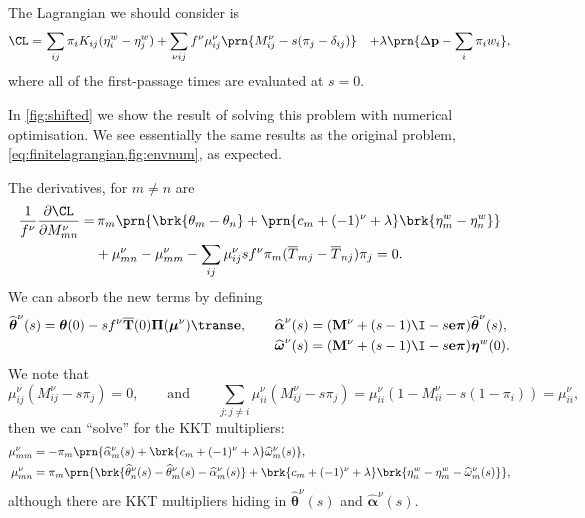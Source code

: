 \documentclass[12pt]{article}
\newcommand{\onev}{\mathbf{e}}
\newcommand{\prm}{p}
\newcommand{\pr}{\mathbf{\prm}}
\newcommand{\eqm}{\pi}
\newcommand{\eq}{\boldsymbol{\eqm}}
\newcommand{\Eqm}{\Pi}
\newcommand{\Eq}{\boldsymbol{\Eqm}}
\newcommand{\fptm}{T}
\newcommand{\fpt}{\mathbf{\fptm}}
\newcommand{\fptbm}{\overline{\fptm}}
\newcommand{\fptb}{\overline{\fpt}}
\newcommand{\etwm}{\eta^w}
\newcommand{\etw}{\boldsymbol{\eta}^w}
\newcommand{\thbm}{\theta}
\newcommand{\thb}{\boldsymbol{\thbm}}
\newcommand{\ombm}{\omega}
\newcommand{\omb}{\boldsymbol{\ombm}}
\newcommand{\albm}{\alpha}
\newcommand{\alb}{\boldsymbol{\albm}}
\newcommand{\wm}{w}
\newcommand{\MMdm}{M}
\newcommand{\MMd}{\mathbf{\MMdm}}
\newcommand{\encm}{K}
\renewcommand{\pdiff}[2]{\frac{\partial #1}{\partial #2}}
\newcommand{\shift}[1]{\widehat{#1}}
\begin{document}
The Lagrangian we should consider is
%
\begin{equation}\label{eq:lshiftlagrangian}
\begin{aligned}
  \CL =&\, \sum_{ij} \eqm_i \encm_{ij} (\etwm_i - \etwm_j)
        +\sum_{\nu i j}  f^\nu \mu^\nu_{ij}\prn{\MMdm^\nu_{ij} -  s (\eqm_j - \delta_{ij}) }
        &+ \lambda \prn{ \Delta\pr - \sum_i \eqm_i \wm_i },
\end{aligned}
\end{equation}
%
where all of the first-passage times are evaluated at \(s = 0\).

In \cref{fig:shifted} we show the result of solving this problem with numerical optimisation.
We see essentially the same results as the original problem, \cref{eq:finitelagrangian,fig:envnum}, as expected.

The derivatives, for $m \neq n$ are
%
\begin{equation}\label{eq:lshiftderivs}
\begin{aligned}
  \frac{1}{f^\nu} \pdiff{\CL}{\MMdm^\nu_{mn}} = & \,
    \eqm_m \prn{ \brk{\thbm_m - \thbm_n}
     + \prn{{c}_m + (-1)^\nu + \lambda} \brk{\etwm_m - \etwm_n} } \\
     &+ \mu^\nu_{mn} -  \mu^\nu_{mm}
     - \sum_{ij} \mu^\nu_{ij} s f^\nu \eqm_m (\fptbm_{mj} - \fptbm_{nj}) \eqm_j
    = 0.
\end{aligned}
\end{equation}
%
We can absorb the new terms by defining
%
\begin{equation*}
\begin{aligned}
  \shift{\thb}^\nu(s) = \thb(0) - s f^\nu \fptb(0) \Eq (\boldsymbol{\mu}^\nu)\trans \onev,
  \qquad
  \shift{\alb}^\nu(s) &= (\MMd^\nu + (s - 1) \I - s \onev \eq) \shift{\thb}^\nu(s),
  \\
  \shift{\omb}^\nu(s) &= (\MMd^\nu + (s - 1) \I - s \onev \eq) \etw(0).
\end{aligned}
\end{equation*}
%
We note that
%
\begin{equation*}
  \mu^\nu_{ij} (\MMdm^\nu_{ij} - s \eqm_j) = 0,
  \qquad \text{and} \qquad
  \sum_{j: j \neq i} \mu^\nu_{ii} (\MMdm^\nu_{ij} - s \eqm_j)
      = \mu^\nu_{ii} (1 - \MMdm^\nu_{ii} - s (1 - \eqm_i)) = \mu^\nu_{ii},
\end{equation*}
%
then we can ``solve'' for the KKT multipliers:
%
\begin{equation}\label{eq:lshiftsol}
\begin{aligned}
  \mu^\nu_{mm} &= - \eqm_m \prn{ \shift{\albm}^\nu_m(s) 
    + \brk{ {c}_m + (-1)^\nu + \lambda } \shift{\ombm}^\nu_m(s)
    }, \\
  \mu^\nu_{mn} &= \eqm_m \prn{ 
      \brk{ \shift{\thbm}^\nu_n(s) - \shift{\thbm}^\nu_m(s) - \shift{\albm}^\nu_m(s) }
    + \brk{ {c}_m + (-1)^\nu + \lambda } 
        \brk{ \etwm_n - \etwm_m - \shift{\ombm}^\nu_m(s) }
     }, \\
\end{aligned}
\end{equation}
%
although there are KKT multipliers hiding in \(\shift{\thb}^\nu(s)\) and \(\shift{\alb}^\nu(s)\).
\end{document}
